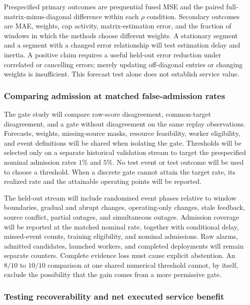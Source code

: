 Prespecified primary outcomes are prequential fused MSE and the paired
full-matrix-minus-diagonal difference within each $\rho$ condition. Secondary
outcomes are MAE, weights, cap activity, matrix-estimation error, and the fraction
of windows in which the methods choose different weights. A stationary segment
and a segment with a changed error relationship will test estimation delay and
inertia. A positive claim requires a useful held-out error reduction under
correlated or cancelling errors; merely updating off-diagonal entries or changing
weights is insufficient. This forecast test alone does not establish service value.

\subsubsection{Comparing admission at matched false-admission rates}
\label{sec:validation-gates}

The gate study will compare raw-score disagreement, common-target disagreement,
and a gate without disagreement on the same replay observations. Forecasts,
weights, missing-source masks, resource feasibility, worker eligibility, and
event definitions will be shared when isolating the gate. Thresholds will be
selected only on a separate historical validation stream to target the
prespecified nominal admission rates $1\%$ and $5\%$. No test event or test outcome
will be used to choose a threshold. When a discrete gate cannot attain the target
rate, its realized rate and the attainable operating points will be reported.

The held-out stream will include randomized event phases relative to window
boundaries, gradual and abrupt changes, operating-only changes, stale feedback,
source conflict, partial outages, and simultaneous outages. Admission coverage
will be reported at the matched nominal rate, together with conditional delay,
missed-event counts, training eligibility, and nominal admissions. Raw alarms,
admitted candidates, launched workers, and completed deployments will remain
separate counters. Complete evidence loss must cause explicit abstention.
An $8/10$ to $10/10$ comparison at one shared numerical threshold cannot, by
itself, exclude the possibility that the gain comes from a more permissive gate.

\subsubsection{Testing recoverability and net executed service benefit}
\label{sec:validation-service}

